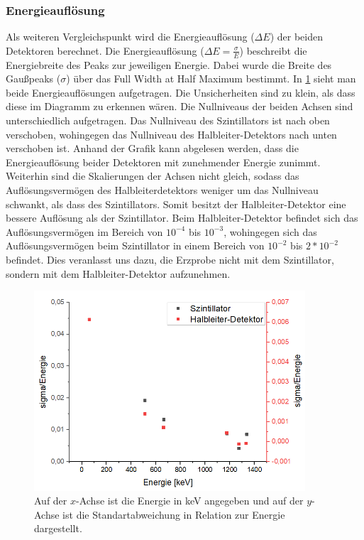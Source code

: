 \subsubsection{Energieauflösung}
Als weiteren Vergleichspunkt wird die Energieauflösung ($\Delta E$) der beiden Detektoren berechnet.
Die Energieauflösung ($\Delta E = \frac{\sigma}{E}$) beschreibt die Energiebreite des Peaks zur jeweiligen Energie. Dabei wurde die Breite des Gaußpeaks ($\sigma$) über das Full Width at Half Maximum bestimmt.
In \cref{sig} sieht man beide Energieauflösungen aufgetragen. Die Unsicherheiten sind zu klein, als dass diese im Diagramm zu erkennen wären.
Die Nullniveaus der beiden Achsen sind unterschiedlich aufgetragen. Das Nullniveau des Szintillators ist nach oben verschoben, wohingegen das Nullniveau des Halbleiter-Detektors nach unten verschoben ist. Anhand der Grafik kann abgelesen werden, dass die Energieauflösung beider Detektoren mit zunehmender Energie zunimmt.
Weiterhin sind die Skalierungen der Achsen nicht gleich, sodass das Auflösungsvermögen des Halbleiterdetektors weniger um das Nullniveau schwankt, als dass des Szintillators. Somit besitzt der Halbleiter-Detektor eine bessere Auflösung als der Szintillator.
Beim Halbleiter-Detektor befindet sich das Auflösungsvermögen im Bereich von $10^{-4}$ bis $10^{-3}$, wohingegen sich das Auflösungsvermögen beim Szintillator in einem Bereich von $10^{-2}$ bis $2*10^{-2}$ befindet.
Dies veranlasst uns dazu, die Erzprobe nicht mit dem Szintillator, sondern mit dem Halbleiter-Detektor aufzunehmen.
\begin{figure}[h!]
	\centering
	\includegraphics[width=0.9\textwidth]{sigma.png}
	\caption{Auf der $x$-Achse ist die Energie in keV angegeben und auf der $y$-Achse ist die Standartabweichung in Relation zur Energie dargestellt.}
	\label{sig}
\end{figure}
